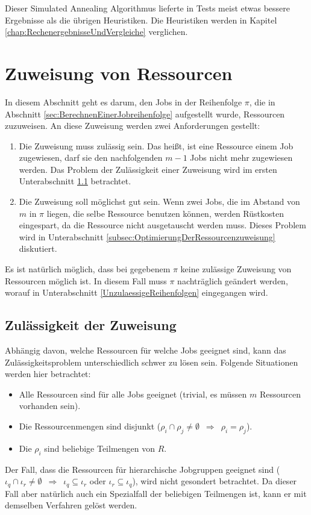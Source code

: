 \documentclass{scrreprt}
\begin{document}
Dieser Simulated Annealing Algorithmus lieferte in Tests meist etwas bessere Ergebnisse als die übrigen Heuristiken.
Die Heuristiken werden in Kapitel \ref{chap:RechenergebnisseUndVergleiche} verglichen.


\section{Zuweisung von Ressourcen}
\label{sec:ZuweisungVonRessourcen}
In diesem Abschnitt geht es darum, den Jobs in der Reihenfolge $\pi$, die in Abschnitt \ref{sec:BerechnenEinerJobreihenfolge} aufgestellt wurde,
Ressourcen zuzuweisen. An diese Zuweisung werden zwei Anforderungen gestellt:
\begin{enumerate}
    \item Die Zuweisung muss zulässig sein. Das heißt, ist eine Ressource einem Job zugewiesen, darf sie den nachfolgenden $m-1$ Jobs nicht mehr zugewiesen werden.
        Das Problem der Zulässigkeit einer Zuweisung wird im ersten Unterabschnitt \ref{subsec:ZulaessigkeitDerZuweisung} betrachtet.
    \item Die Zuweisung soll möglichst gut sein. Wenn zwei Jobs, die im Abstand von $m$ in $\pi$ liegen, die selbe Ressource benutzen können,
        werden Rüstkosten eingespart, da die Ressource nicht ausgetauscht werden muss.
        Dieses Problem wird in Unterabschnitt \ref{subsec:OptimierungDerRessourcenzuweisung} diskutiert.
\end{enumerate}
Es ist natürlich möglich, dass bei gegebenem $\pi$ keine zulässige Zuweisung von Ressourcen möglich ist.
In diesem Fall muss $\pi$ nachträglich geändert werden, worauf in Unterabschnitt \ref{UnzulaessigeReihenfolgen} eingegangen wird.

\subsection{Zulässigkeit der Zuweisung}
\label{subsec:ZulaessigkeitDerZuweisung}
Abhängig davon, welche Ressourcen für welche Jobs geeignet sind, kann das Zulässigkeitsproblem unterschiedlich schwer zu lösen sein.
Folgende Situationen werden hier betrachtet:
\begin{itemize}
    \item Alle Ressourcen sind für alle Jobs geeignet (trivial, es müssen $m$ Ressourcen vorhanden sein).
    \item Die Ressourcenmengen sind disjunkt ($\rho_i\cap\rho_j \neq \emptyset \enspace \Rightarrow \enspace \rho_i = \rho_j$).
    \item Die $\rho_i$ sind beliebige Teilmengen von $R$.
\end{itemize}
Der Fall, dass die Ressourcen für hierarchische Jobgruppen geeignet sind 
($\iota_q\cap\iota_r \neq \emptyset \enspace \Rightarrow \enspace \iota_q\subseteq\iota_r$ oder $\iota_r\subseteq\iota_q$),
wird nicht gesondert betrachtet.
Da dieser Fall aber natürlich auch ein Spezialfall der beliebigen Teilmengen ist, kann er mit demselben Verfahren gelöst werden.
\end{document}

